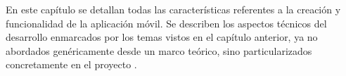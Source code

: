 En este capítulo se detallan todas las características referentes a la creación y funcionalidad de la aplicación móvil. Se describen los aspectos técnicos del desarrollo enmarcados por los temas vistos en el capítulo anterior, ya no abordados genéricamente desde un marco teórico, sino particularizados concretamente en el proyecto \nombreApp. 

